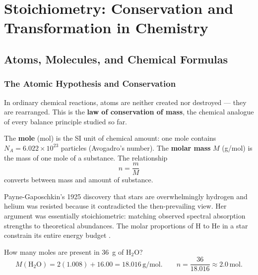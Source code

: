 \documentclass[11pt, openany]{book}
\theoremstyle{plain}
\theoremstyle{definition}
\theoremstyle{remark}
\newcommand{\mol}{{\,\text{mol}}}
\newcommand{\gpm}{{\,\text{g/mol}}}
\begin{document}
\part{Stoichiometry: Conservation and Transformation in Chemistry}

\chapter{Atoms, Molecules, and Chemical Formulas}

\section{The Atomic Hypothesis and Conservation}

In ordinary chemical reactions, atoms are neither created nor destroyed ---
they are rearranged. This is the \textbf{law of conservation of mass}, the
chemical analogue of every balance principle studied so far.

\begin{mydefinition}
The \textbf{mole} (mol) is the SI unit of chemical amount: one mole contains
$N_A=6.022\times10^{23}$ particles (Avogadro's number). The
\textbf{molar mass} $M$ (g/mol) is the mass of one mole of a substance.
The relationship
\[
  n = \frac{m}{M}
\]
converts between mass and amount of substance.
\end{mydefinition}

\begin{history}
Payne-Gaposchkin's 1925 discovery that stars are overwhelmingly hydrogen and
helium was resisted because it contradicted the then-prevailing view. Her
argument was essentially stoichiometric: matching observed spectral absorption
strengths to theoretical abundances. The molar proportions of H to He in a
star constrain its entire energy budget \citep{PayneGaposchkin1925}.
\end{history}

\begin{myexample}
How many moles are present in 36~g of $\mathrm{H_2O}$?
\[
  M(\mathrm{H_2O})=2(1.008)+16.00=18.016\gpm.
  \qquad
  n=\frac{36}{18.016}\approx2.0\mol.
\]
\end{myexample}
\end{document}
